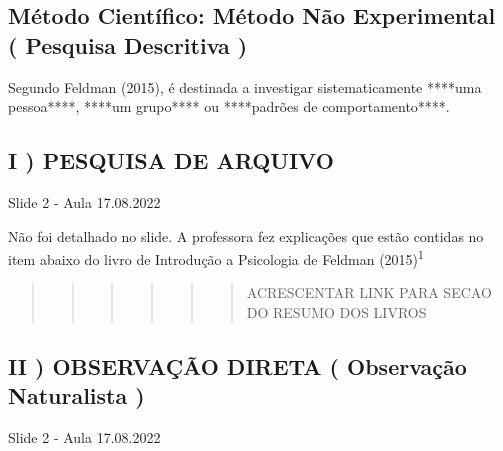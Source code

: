 \documentclass[
]{book}
\begin{document}
\hypertarget{muxe9todo-cientuxedfico-muxe9todo-nuxe3o-experimental-pesquisa-descritiva}{%
\subsection{Método Científico: Método Não Experimental ( Pesquisa Descritiva )}\label{muxe9todo-cientuxedfico-muxe9todo-nuxe3o-experimental-pesquisa-descritiva}}

Segundo Feldman (2015), é destinada a investigar sistematicamente ****uma pessoa****, ****um grupo**** ou ****padrões de comportamento****.

\hypertarget{i-pesquisa-de-arquivo}{%
\subsection{I ) PESQUISA DE ARQUIVO}\label{i-pesquisa-de-arquivo}}

Slide 2 - Aula 17.08.2022

Não foi detalhado no slide. A professora fez explicações que estão contidas no item abaixo do livro de Introdução a Psicologia de Feldman (2015)\textsuperscript{1}

\begin{quote}
\begin{quote}
\begin{quote}
\begin{quote}
\begin{quote}
\begin{quote}
ACRESCENTAR LINK PARA SECAO DO RESUMO DOS LIVROS
\end{quote}
\end{quote}
\end{quote}
\end{quote}
\end{quote}
\end{quote}

\hypertarget{ii-observauxe7uxe3o-direta-observauxe7uxe3o-naturalista}{%
\subsection{II ) OBSERVAÇÃO DIRETA ( Observação Naturalista )}\label{ii-observauxe7uxe3o-direta-observauxe7uxe3o-naturalista}}

Slide 2 - Aula 17.08.2022
\end{document}
